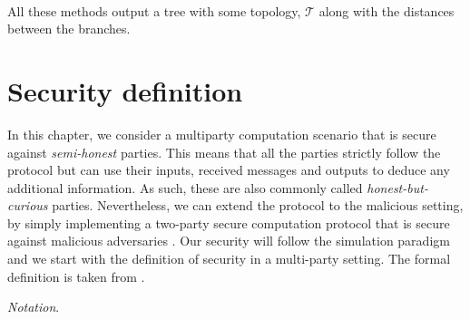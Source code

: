 \

All these methods output a tree with some topology, $\mathcal{T}$ along with the distances between the branches. 







\section{Security definition} \label{secDefition}

In this chapter, we consider a multiparty computation scenario that is secure against \textit{semi-honest} parties. This means that all the parties strictly follow the protocol but can use their inputs, received messages and outputs to deduce any additional information. As such, these are also commonly called \textit{honest-but-curious} parties. Nevertheless, we can extend the protocol to the malicious setting, by simply implementing a two-party secure computation protocol that is secure against malicious adversaries \cite{Evans2018}. Our security will follow the simulation paradigm and we start with the definition of security in a multi-party setting. The formal definition is taken from \cite{Evans2018}.

\textit{Notation}. 

